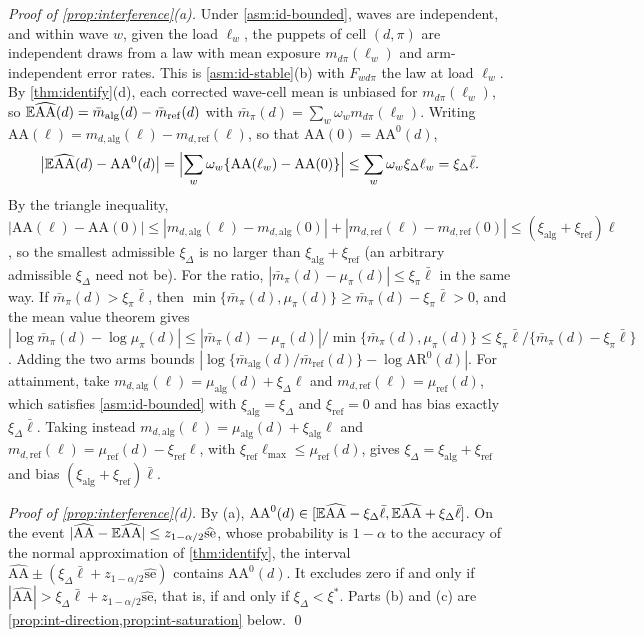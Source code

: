 \emph{Proof of \cref{prop:interference}(a).} Under \cref{asm:id-bounded}, waves are independent, and within wave $w$, given the load $\ell_w$, the puppets of cell $(d,\pi)$ are independent draws from a law with mean exposure $m_{d\pi}(\ell_w)$ and arm-independent error rates. This is \cref{asm:id-stable}(b) with $F_{wd\pi}$ the law at load $\ell_w$. By \cref{thm:identify}(d), each corrected wave-cell mean is unbiased for $m_{d\pi}(\ell_w)$, so $\mathbb{E}\widehat{\mathrm{AA}}(d)=\bar m_{\mathrm{alg}}(d)-\bar m_{\mathrm{ref}}(d)$ with $\bar m_\pi(d)=\sum_w\omega_wm_{d\pi}(\ell_w)$. Writing $\mathrm{AA}(\ell)=m_{d,\mathrm{alg}}(\ell)-m_{d,\mathrm{ref}}(\ell)$, so that $\mathrm{AA}(0)=\mathrm{AA}^0(d)$,
\[
  \bigl|\mathbb{E}\widehat{\mathrm{AA}}(d)-\mathrm{AA}^0(d)\bigr|=\Bigl|\sum_w\omega_w\{\mathrm{AA}(\ell_w)-\mathrm{AA}(0)\}\Bigr|\le\sum_w\omega_w\xi_\Delta\ell_w=\xi_\Delta\bar\ell .
\]
By the triangle inequality, $|\mathrm{AA}(\ell)-\mathrm{AA}(0)|\le|m_{d,\mathrm{alg}}(\ell)-m_{d,\mathrm{alg}}(0)|+|m_{d,\mathrm{ref}}(\ell)-m_{d,\mathrm{ref}}(0)|\le(\xi_{\mathrm{alg}}+\xi_{\mathrm{ref}})\ell$, so the smallest admissible $\xi_\Delta$ is no larger than $\xi_{\mathrm{alg}}+\xi_{\mathrm{ref}}$ (an arbitrary admissible $\xi_\Delta$ need not be). For the ratio, $|\bar m_\pi(d)-\mu_\pi(d)|\le\xi_\pi\bar\ell$ in the same way. If $\bar m_\pi(d)>\xi_\pi\bar\ell$, then $\min\{\bar m_\pi(d),\mu_\pi(d)\}\ge\bar m_\pi(d)-\xi_\pi\bar\ell>0$, and the mean value theorem gives $|\log\bar m_\pi(d)-\log\mu_\pi(d)|\le|\bar m_\pi(d)-\mu_\pi(d)|/\min\{\bar m_\pi(d),\mu_\pi(d)\}\le\xi_\pi\bar\ell/\{\bar m_\pi(d)-\xi_\pi\bar\ell\}$. Adding the two arms bounds $|\log\{\bar m_{\mathrm{alg}}(d)/\bar m_{\mathrm{ref}}(d)\}-\log\mathrm{AR}^0(d)|$. For attainment, take $m_{d,\mathrm{alg}}(\ell)=\mu_{\mathrm{alg}}(d)+\xi_\Delta\ell$ and $m_{d,\mathrm{ref}}(\ell)=\mu_{\mathrm{ref}}(d)$, which satisfies \cref{asm:id-bounded} with $\xi_{\mathrm{alg}}=\xi_\Delta$ and $\xi_{\mathrm{ref}}=0$ and has bias exactly $\xi_\Delta\bar\ell$. Taking instead $m_{d,\mathrm{alg}}(\ell)=\mu_{\mathrm{alg}}(d)+\xi_{\mathrm{alg}}\ell$ and $m_{d,\mathrm{ref}}(\ell)=\mu_{\mathrm{ref}}(d)-\xi_{\mathrm{ref}}\ell$, with $\xi_{\mathrm{ref}}\ell_{\max}\le\mu_{\mathrm{ref}}(d)$, gives $\xi_\Delta=\xi_{\mathrm{alg}}+\xi_{\mathrm{ref}}$ and bias $(\xi_{\mathrm{alg}}+\xi_{\mathrm{ref}})\bar\ell$.

\emph{Proof of \cref{prop:interference}(d).} By (a), $\mathrm{AA}^0(d)\in[\mathbb{E}\widehat{\mathrm{AA}}-\xi_\Delta\bar\ell,\mathbb{E}\widehat{\mathrm{AA}}+\xi_\Delta\bar\ell]$. On the event $|\widehat{\mathrm{AA}}-\mathbb{E}\widehat{\mathrm{AA}}|\le z_{1-\alpha/2}\widehat{\mathrm{se}}$, whose probability is $1-\alpha$ to the accuracy of the normal approximation of \cref{thm:identify}, the interval $\widehat{\mathrm{AA}}\pm(\xi_\Delta\bar\ell+z_{1-\alpha/2}\widehat{\mathrm{se}})$ contains $\mathrm{AA}^0(d)$. It excludes zero if and only if $|\widehat{\mathrm{AA}}|>\xi_\Delta\bar\ell+z_{1-\alpha/2}\widehat{\mathrm{se}}$, that is, if and only if $\xi_\Delta<\xi^\ast$. Parts (b) and (c) are \cref{prop:int-direction,prop:int-saturation} below.
\qed

